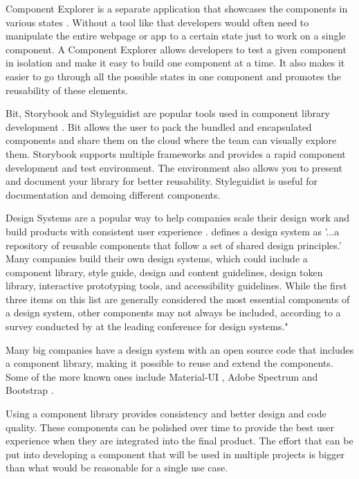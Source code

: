 \documentclass{master_thesis}
\begin{document}
Component Explorer is a separate application that showcases the components in various states \citep{Coleman2017}. Without a tool like that developers would often need to manipulate the entire webpage or app to a certain state just to work on a single component. A Component Explorer allows developers to test a given component in isolation and make it easy to build one component at a time. It also makes it easier to go through all the possible states in one component and promotes the reusability of these elements.

Bit, Storybook and Styleguidist are popular tools used in component library development \citep{Ella2019}. Bit allows the user to pack the bundled and encapsulated components and share them on the cloud where the team can visually explore them. Storybook supports multiple frameworks and provides a rapid component development and test environment. The environment also allows you to present and document your library for better reusability. Styleguidist is useful for documentation and demoing different components.

Design Systems are a popular way to help companies scale their design work and build products with consistent user experience \citep{Yew2020}. \citeauthor{Yew2020} defines a design system as '...a repository of reusable components that follow a set of shared design principles.' Many companies build their own design systems, which could include a component library, style guide, design and content guidelines, design token library, interactive prototyping tools, and accessibility guidelines. While the first three items on this list are generally considered the most essential components of a design system, other components may not always be included, according to a survey conducted by \citeauthor{Yew2020} at the leading conference for design systems."

Many big companies have a design system with an open source code that includes a component library, making it possible to reuse and extend the components. Some of the more known ones include Material-UI \citep{MUS}, Adobe Spectrum \citep{Adobe} and Bootstrap \citep{Collings}.




Using a component library provides consistency and better design and code quality. These components can be polished over time to provide the best user experience when they are integrated into the final product. The effort that can be put into developing a component that will be used in multiple projects is bigger than what would be reasonable for a single use case.
\end{document}
